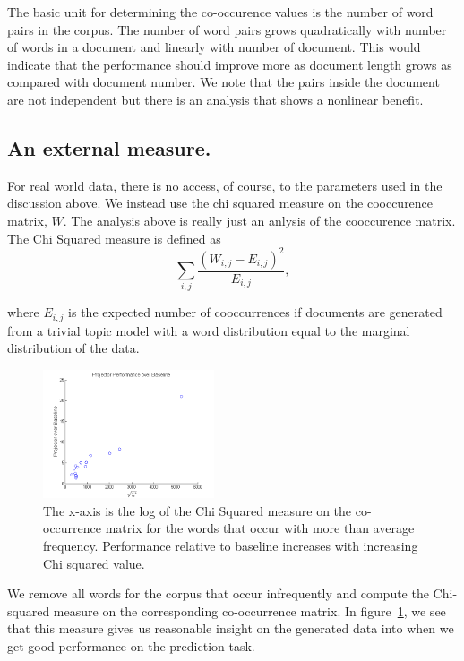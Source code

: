 The basic unit for determining the co-occurence values is the
number of word pairs in the corpus. The number of word pairs
grows quadratically with number of words in a document
and linearly with number of document.  This would indicate
that the performance should improve more as document length
grows as compared with document number.  We note that
the pairs inside the document are not independent but
there is an analysis that shows a nonlinear benefit.


\subsection{An external measure.}


For real world data, there is no access, of course, to the parameters
used in the discussion above. We instead use the chi squared measure
on the cooccurence matrix, $W$.  The analysis above is really just an
anlysis of the cooccurence matrix. The Chi Squared measure is defined
as $$\sum_{i,j} \frac{(W_{i,j} - E_{i,j})^2}{E_{i,j}},$$

where $E_{i,j}$ is the expected number of cooccurrences if
documents are generated from a trivial topic model with
a word distribution equal to the marginal distribution
of the data. 


\begin{figure}
     \begin{center}
            \includegraphics[width=0.45\textwidth]{x2.png}

    \end{center}
    \caption{The x-axis is the log of the Chi Squared measure on the co-occurrence matrix for the words that occur with more than average frequency. Performance relative to baseline increases with increasing Chi squared value.}
   \label{fig:x2}
\end{figure}


We remove all words for the corpus that occur infrequently and
compute the Chi-squared measure on the corresponding co-occurrence
matrix.  In figure~\ref{fig:x2}, we see that this measure 
gives us reasonable insight on the generated data
into when we get good performance on the prediction
task. 


